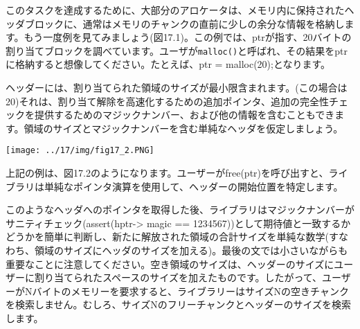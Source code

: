 \href{../17/img/fig17_1.PNG}{}

このタスクを達成するために、大部分のアロケータは、メモリ内に保持されたヘッダブロックに、通常はメモリのチャンクの直前に少しの余分な情報を格納します。もう一度例を見てみましょう(図17.1)。この例では、ptrが指す、20バイトの割り当てブロックを調べています。ユーザが\texttt{malloc()}と呼ばれ、その結果をptrに格納すると想像してください。たとえば、ptr
= malloc(20);となります。

ヘッダーには、割り当てられた領域のサイズが最小限含まれます。(この場合は20)それは、割り当て解除を高速化するための追加ポインタ、追加の完全性チェックを提供するためのマジックナンバー、および他の情報を含むこともできます。領域のサイズとマジックナンバーを含む単純なヘッダを仮定しましょう。

\begin{Shaded}
\begin{Highlighting}[]
 
\end{Highlighting}
\end{Shaded}

\texttt{[image: ../17/img/fig17\_2.PNG]}

上記の例は、図17.2のようになります。ユーザーがfree(ptr)を呼び出すと、ライブラリは単純なポインタ演算を使用して、ヘッダーの開始位置を特定します。

\begin{Shaded}
\begin{Highlighting}[]
\end{Highlighting}
\end{Shaded}

このようなヘッダへのポインタを取得した後、ライブラリはマジックナンバーがサニティチェック(assert(hptr-\textgreater{}
magic ==
1234567))として期待値と一致するかどうかを簡単に判断し、新たに解放された領域の合計サイズを単純な数学(すなわち、領域のサイズにヘッダのサイズを加える)。最後の文では小さいながらも重要なことに注意してください。空き領域のサイズは、ヘッダーのサイズにユーザーに割り当てられたスペースのサイズを加えたものです。したがって、ユーザーがNバイトのメモリーを要求すると、ライブラリーはサイズNの空きチャンクを検索しません。むしろ、サイズNのフリーチャンクとヘッダーのサイズを検索します。

